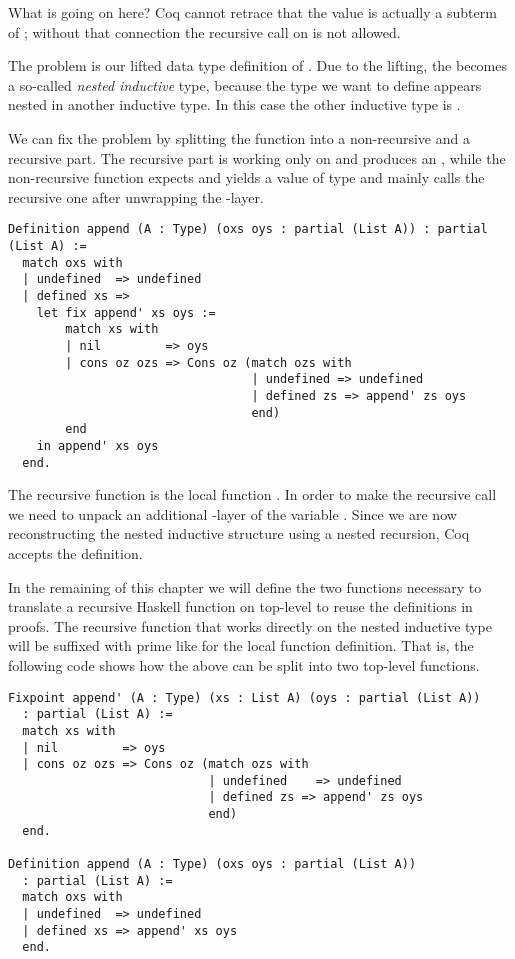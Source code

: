 What is going on here?
Coq cannot retrace that the value  is actually a
subterm of ; without that connection the
recursive call on  is not allowed.

The problem is our lifted data type definition of
.
Due to the lifting, the  becomes a so-called
\emph{nested inductive} type, because the type we want to define
appears nested in another inductive type.
In this case the other inductive type is .

We can fix the problem by splitting the function into a non-recursive
and a recursive part.
The recursive part is working only on  and
produces an , while the non-recursive
function expects and yields a value of type  and mainly calls the recursive one after unwrapping the
-layer.

\begin{verbatim}
Definition append (A : Type) (oxs oys : partial (List A)) : partial (List A) :=
  match oxs with
  | undefined  => undefined
  | defined xs =>
    let fix append' xs oys :=
        match xs with
        | nil         => oys
        | cons oz ozs => Cons oz (match ozs with
                                  | undefined => undefined
                                  | defined zs => append' zs oys
                                  end)
        end
    in append' xs oys
  end.
\end{verbatim}

The recursive function is the local function
.
In order to make the recursive call we need to unpack an additional
-layer of the variable .
Since we are now reconstructing the nested inductive structure using a
nested recursion, Coq accepts the definition.

In the remaining of this chapter we will define the two functions
necessary to translate a recursive Haskell function on top-level to
reuse the definitions in proofs.
The recursive function that works directly on the nested inductive
type will be suffixed with prime like for the local function definition.
That is, the following code shows how the above can be split into two
top-level functions.

\begin{verbatim}
Fixpoint append' (A : Type) (xs : List A) (oys : partial (List A))
  : partial (List A) :=
  match xs with
  | nil         => oys
  | cons oz ozs => Cons oz (match ozs with
                            | undefined    => undefined
                            | defined zs => append' zs oys
                            end)
  end.

Definition append (A : Type) (oxs oys : partial (List A))
  : partial (List A) :=
  match oxs with
  | undefined  => undefined
  | defined xs => append' xs oys
  end.
\end{verbatim}

